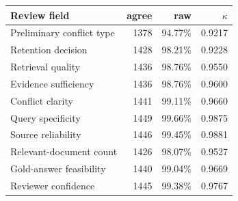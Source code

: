 {\tabstyle\setlength{\tabcolsep}{2.5pt}
\begin{tabular*}{\linewidth}[t]{@{\extracolsep{\fill}}l rr r@{}}\toprule
\textbf{Review field} & \textbf{agree} & \textbf{raw} & $\kappa$\\\midrule
Preliminary conflict type & 1378 & 94.77\% & 0.9217\\
Retention decision & 1428 & 98.21\% & 0.9228\\
Retrieval quality & 1436 & 98.76\% & 0.9550\\
Evidence sufficiency & 1436 & 98.76\% & 0.9600\\
Conflict clarity & 1441 & 99.11\% & 0.9660\\
Query specificity & 1449 & 99.66\% & 0.9875\\
Source reliability & 1446 & 99.45\% & 0.9881\\
Relevant-document count & 1426 & 98.07\% & 0.9527\\
Gold-answer feasibility & 1440 & 99.04\% & 0.9669\\
Reviewer confidence & 1445 & 99.38\% & 0.9767\\
\bottomrule\end{tabular*}}
